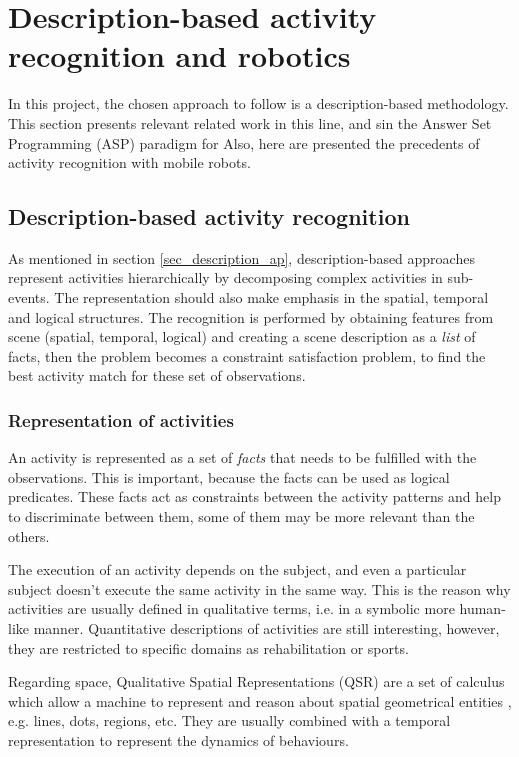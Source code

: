\section{Description-based activity recognition and robotics} \label{sec_DBROB}

In this project, the chosen approach to follow is a description-based methodology. 
This section presents relevant related work in this line, and sin the Answer Set Programming (ASP) paradigm for 
Also, here are presented the precedents of activity recognition with mobile robots.

\subsection{Description-based activity recognition}

As mentioned in section \ref{sec_description_ap}, description-based approaches represent activities hierarchically by decomposing complex activities in sub-events.
The representation should also make emphasis in the spatial, temporal and logical structures.
The recognition is performed by obtaining features from scene (spatial, temporal, logical) and creating a scene description as a \textit{list} of facts, then the problem becomes a constraint satisfaction problem, to find the best activity match for these set of observations. 

\subsubsection{Representation of activities}

An activity is represented as a set of \textit{facts} that needs to be fulfilled with the observations.
This is important, because the facts can be used as logical predicates.
These facts act as constraints between the activity patterns and help to discriminate between them, some of them may be more relevant than the others.

The execution of an activity depends on the subject, and even a particular subject doesn't execute the same activity in the same way.
This is the reason why activities are usually defined in qualitative terms, i.e. in a symbolic more human-like manner.
Quantitative descriptions of activities are still interesting, however, they are restricted to specific domains as rehabilitation or sports.

Regarding space, Qualitative Spatial Representations (QSR) are a set of calculus which allow a machine to represent and reason about spatial geometrical entities \citep{Cohn2008_QSRR}, e.g. lines, dots, regions, etc.
They are usually combined with a temporal representation to represent the dynamics of behaviours.

